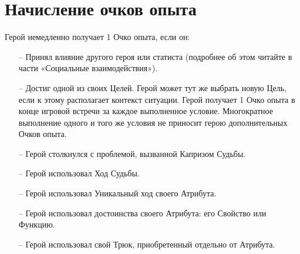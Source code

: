 \section{Начисление очков опыта}
Герой немедленно получает 1 Очко опыта, если он:
\begin{itemize}
\item[--] Принял влияние другого героя или статиста (подробнее об этом читайте в части «Социальные взаимодействия»).
\item[--] Достиг одной из своих Целей. Герой может тут же выбрать новую Цель, если к этому располагает контекст ситуации. Герой получает 1 Очко опыта в конце игровой встречи за каждое выполненное условие. Многократное выполнение одного и того же условия не приносит герою дополнительных Очков опыта.
\item[--] Герой столкнулся с проблемой, вызванной Капризом Судьбы.
\item[--] Герой использовал Ход Судьбы.
\item[--] Герой использовал Уникальный ход своего Атрибута.
\item[--] Герой использовал достоинства своего Атрибута: его Свойство или Функцию.
\item[--] Герой использовал свой Трюк, приобретенный отдельно от Атрибута.
\end{itemize}

